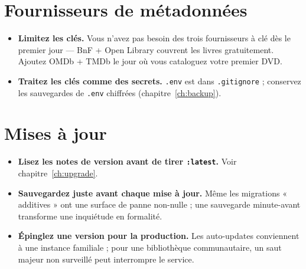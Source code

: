 \section{Fournisseurs de métadonnées}

\begin{itemize}
  \item \textbf{Limitez les clés.} Vous n'avez pas besoin des
        trois fournisseurs à clé dès le premier jour — BnF + Open
        Library couvrent les livres gratuitement. Ajoutez OMDb +
        TMDb le jour où vous cataloguez votre premier DVD.
  \item \textbf{Traitez les clés comme des secrets.} \texttt{.env}
        est dans \texttt{.gitignore} ; conservez les sauvegardes
        de \texttt{.env} chiffrées (chapitre~\ref{ch:backup}).
\end{itemize}

\section{Mises à jour}

\begin{itemize}
  \item \textbf{Lisez les notes de version avant de tirer
        \texttt{:latest}.} Voir chapitre~\ref{ch:upgrade}.
  \item \textbf{Sauvegardez juste avant chaque mise à jour.} Même
        les migrations « additives » ont une surface de panne
        non-nulle ; une sauvegarde minute-avant transforme une
        inquiétude en formalité.
  \item \textbf{Épinglez une version pour la production.} Les
        auto-updates conviennent à une instance familiale ; pour
        une bibliothèque communautaire, un saut majeur non
        surveillé peut interrompre le service.
\end{itemize}
